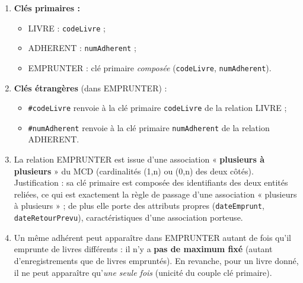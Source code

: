 \documentclass[11pt]{article}
\begin{document}
\begin{corrige}
\begin{enumerate}
  \item \textbf{Clés primaires :}
  \begin{itemize}
    \item LIVRE : \texttt{codeLivre} ;
    \item ADHERENT : \texttt{numAdherent} ;
    \item EMPRUNTER : clé primaire \emph{composée} (\texttt{codeLivre}, \texttt{numAdherent}).
  \end{itemize}
  \item \textbf{Clés étrangères} (dans EMPRUNTER) :
  \begin{itemize}
    \item \texttt{\#codeLivre} renvoie à la clé primaire \texttt{codeLivre} de la relation LIVRE ;
    \item \texttt{\#numAdherent} renvoie à la clé primaire \texttt{numAdherent} de la relation ADHERENT.
  \end{itemize}
  \item La relation EMPRUNTER est issue d'une association « \textbf{plusieurs à plusieurs} » du MCD (cardinalités (1,n) ou (0,n) des deux côtés). Justification : sa clé primaire est composée des identifiants des deux entités reliées, ce qui est exactement la règle de passage d'une association « plusieurs à plusieurs » ; de plus elle porte des attributs propres (\texttt{dateEmprunt}, \texttt{dateRetourPrevu}), caractéristiques d'une association porteuse.
  \item Un même adhérent peut apparaître dans EMPRUNTER autant de fois qu'il emprunte de livres différents : il n'y a \textbf{pas de maximum fixé} (autant d'enregistrements que de livres empruntés). En revanche, pour un livre donné, il ne peut apparaître qu'\emph{une seule fois} (unicité du couple clé primaire).
\end{enumerate}
\end{corrige}
\end{document}
